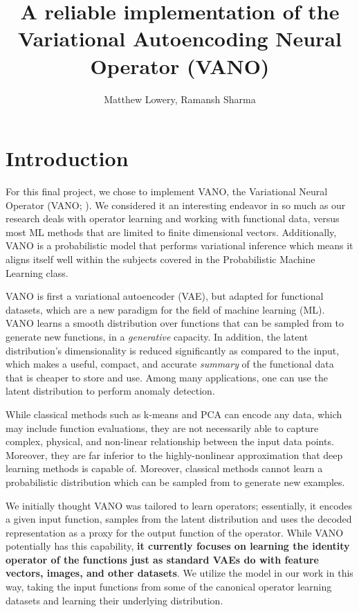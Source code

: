 \documentclass[11pt, fullpage,letterpaper]{article}
\title{A reliable implementation of the Variational Autoencoding Neural Operator (VANO)}
\author{Matthew Lowery, Ramansh Sharma}
\date{}
\begin{document}


\maketitle

\section{Introduction}


For this final project, we chose to implement VANO, the Variational Neural Operator (VANO; \cite{seidman2023variational}). We considered it an interesting endeavor in so much as our research deals with operator learning and working with functional data, versus most ML methods that are limited to finite dimensional vectors. Additionally, VANO is a probabilistic model that performs variational inference which means it aligns itself well within the subjects covered in the Probabilistic Machine Learning class. 

VANO is first a variational autoencoder (VAE), but adapted for functional datasets, which are a new paradigm for the field of machine learning (ML). VANO learns a smooth distribution over functions that can be sampled from to generate new functions, in a \emph{generative} capacity. In addition, the latent distribution's dimensionality is reduced significantly as compared to the input, which makes a useful, compact, and accurate \textit{summary} of the functional data that is cheaper to store and use. Among many applications, one can use the latent distribution to perform anomaly detection. 

While classical methods such as k-means and PCA can encode any data, which may include function evaluations, they are not necessarily able to capture complex, physical, and non-linear relationship between the input data points. Moreover, they are far inferior to the highly-nonlinear approximation that deep learning methods is capable of. Moreover, classical methods cannot learn a probabilistic distribution which can be sampled from to generate new examples. 

We initially thought VANO was tailored to learn operators; essentially, it encodes a given input function, samples from the latent distribution and uses the decoded representation as a proxy for the output function of the operator. While VANO potentially has this capability, \textbf{it currently focuses on learning the identity operator of the functions just as standard VAEs do with feature vectors, images, and other datasets}. We utilize the model in our work in this way, taking the input functions from some of the canonical operator learning datasets and learning their underlying distribution. 
\end{document}
